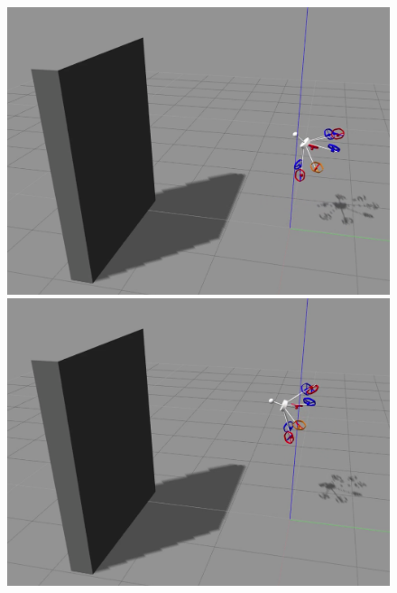 \begin{figure}[!ht]
\begin{center}
\begin{minipage}[t]{0.495\textwidth}
    \end{minipage}
    \hfill
    \begin{minipage}[t]{0.495\textwidth}
      \includegraphics[width=\linewidth]{images/Selection_011.png}
    \end{minipage}
    \hfill
    \begin{minipage}[t]{0.495\textwidth}
      \includegraphics[width=\linewidth]{images/Selection_013.png}
    \end{minipage}
    \hfill
    \begin{minipage}[t]{0.495\textwidth}

\end{minipage}
\end{center}
\end{figure}
